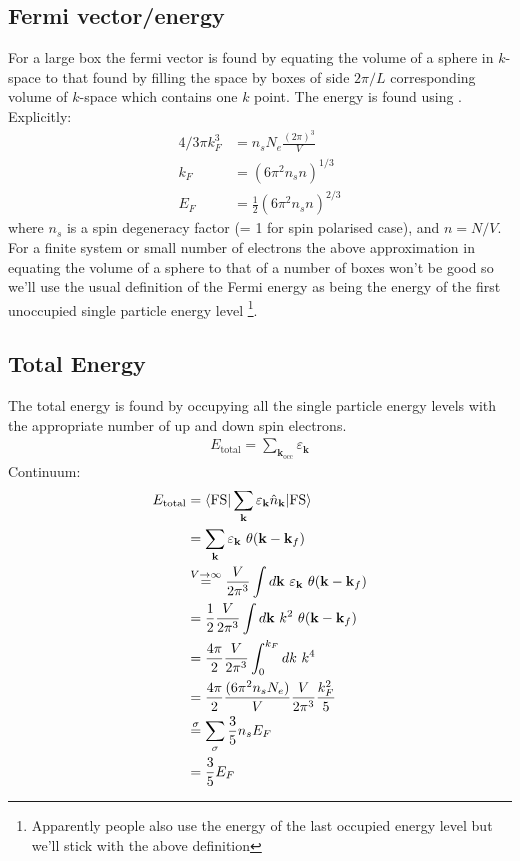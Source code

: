 \documentclass[11pt,twosided]{article}
\begin{document}
\subsection{Fermi vector/energy}
For a large box the fermi vector is found by equating the volume of a sphere in $k$-space to that found by filling the space by boxes of side $2\pi/L$ corresponding volume of $k$-space which contains one $k$ point.
The energy is found using .
Explicitly:
\begin{align}
    4/3 \pi k_F^3 &= n_s N_e\frac{(2\pi)^3}{V}\\
            k_F &= (6 \pi^2 n_s n)^{1/3}\\
            E_F &= \frac{1}{2}(6 \pi^2 n_s n)^{2/3}
\end{align}
where $n_s$ is a spin degeneracy factor (= 1 for spin polarised case), and $n = N/V$.
For a finite system or small number of electrons the above approximation in equating the volume of a sphere to that of a number of boxes won't be good so we'll use the usual definition of the Fermi energy as being the energy of the first unoccupied single particle energy level \footnote{Apparently people also use the energy of the last occupied energy level but we'll stick with the above definition}.
\subsection{Total Energy}
The total energy is found by occupying all the single particle energy levels with the appropriate number of up and down spin electrons.
\begin{align}
    E_{\mathrm{total}} = \sum_{\mathbf{k}_{\mathrm{occ}}} \varepsilon_\mathbf{k}
\end{align}
Continuum:
\begin{align}\label{tot_e}
    E_{\mathrm{total}} &= \bra{\mathrm{FS}}\sum_{\mathbf{k}} \varepsilon_{\mathbf{k}} \hat{n}_\mathbf{k} \ket{\mathrm{FS}}\\
                       &= \sum_{\mathbf{k}}\varepsilon_{\mathbf{k}} \ \theta(\mathbf{k} - \mathbf{k}_f)\\
                       &\stackrel{V\rightarrow\infty}{=} \frac{V}{2\pi^3}\int d\mathbf{k} \ \varepsilon_{\mathbf{k}} \ \theta(\mathbf{k} - \mathbf{k}_f)\\
                       &=\frac{1}{2} \frac{V}{2\pi^3} \int d\mathbf{k} \ k^2 \ \theta(\mathbf{k} - \mathbf{k}_f)\\
                       &=\frac{4\pi}{2} \frac{V}{2\pi^3} \int_0^{k_F} dk \ k^4  \\
                       &=\frac{4\pi}{2}\frac{(6 \pi^2 n_s N_e)}{V}\frac{V}{2\pi^3}\frac{k_F^2}{5}\\
                       &\stackrel{\sigma}{=}\sum_\sigma\frac{3}{5}n_sE_F\\
                       &=\frac{3}{5}E_F
\end{align}
\end{document}
